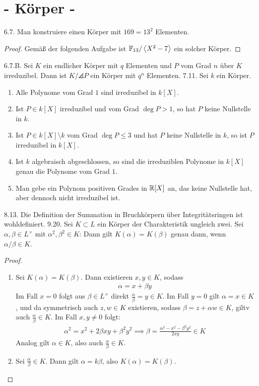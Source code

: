 \documentclass{article}
\newcommand{\ex}[1]{\tit{Übung} #1.}
\begin{document}
	\section*{\centering - Körper -}
		\ex{6.7} Man konstruiere einen Körper mit $169 = 13^2$ Elementen.
		\begin{proof}
			Gemäß der folgenden Aufgabe ist $\mathbb{F}_{13}/\left\langle X^2 - 7 \right\rangle$ ein solcher Körper.
		\end{proof}
		\newpar
		\ex{6.7.B} Sei $K$ ein endlicher Körper mit $q$ Elementen und $P$ vom Grad $n$ über $K$ irreduzibel. Dann ist $K/\angles{P}$ ein Körper mit $q^n$ Elementen.
		\newpar
		\ex{7.11} Sei $k$ ein Körper.
		\begin{enumerate}
			\item Alle Polynome vom Grad $1$ sind irreduzibel in $k[X]$.
			\item Ist $P \in k[X]$ irreduzibel und vom Grad $\deg P > 1$, so hat $P$ keine Nullstelle in $k$.
			\item Ist $P \in k[X] \setminus k$ vom Grad $\deg P \leq 3$ und hat $P$ keine Nullstelle in $k$, so ist $P$ irreduzibel in $k[X]$.
			\item Ist $k$ algebraisch abgeschlossen, so sind die irreduziblen Polynome in $k[X]$ genau die Polynome vom Grad $1$.
			\item Man gebe ein Polynom positiven Grades in $\mathbb{R}[X]$ an, das keine Nullstelle hat, aber dennoch nicht irreduzibel ist.
		\end{enumerate}
		\newpar
		\ex{8.13} Die Definition der Summation in Bruchkörpern über Integritätsringen ist wohldefiniert.
		\newpar
		\ex{9.20} Sei $K \subset L$ ein Körper der Charakteristik ungleich zwei. Sei $\alpha, \beta \in L^\times$ mit $\alpha^2, \beta^2 \in K$: Dann gilt $K(\alpha) = K(\beta)$ genau dann, wenn $\alpha/\beta \in K$.
		\begin{proof}
			\begin{enumerate}
				\item Sei $K(\alpha) = K(\beta)$. Dann existieren $x,y \in K$, sodass
				\begin{align*}
					\alpha = x + \beta y
				\end{align*}
				Im Fall $x = 0$ folgt aus $\beta \in L^\times$ direkt $\frac{\alpha}{\beta} = y \in K$.
				\newpar
				Im Fall $y = 0$ gilt $\alpha = x \in K$, und da symmetrisch auch $z,w \in K$ existieren, sodass $\beta = z + \alpha w \in K$, giltv auch $\frac{\alpha}{\beta} \in K$.
				\newpar
				Im Fall $x,y \neq 0$ folgt:
				\begin{align*}
					\alpha^2 = x^2 + 2\beta xy + \beta^2y^2
					\implies \beta = \frac{\alpha^2 - x^2 - \beta^2y^2}{2xy} \in K
				\end{align*}
				Analog gilt $\alpha \in K$, also auch $\frac{\alpha}{\beta} \in K$.
				\item Sei $\frac{\alpha}{\beta} \in K$. Dann gilt $\alpha = k\beta$, also $K(\alpha) = K(\beta)$.
			\end{enumerate}
		\end{proof}
\end{document}
